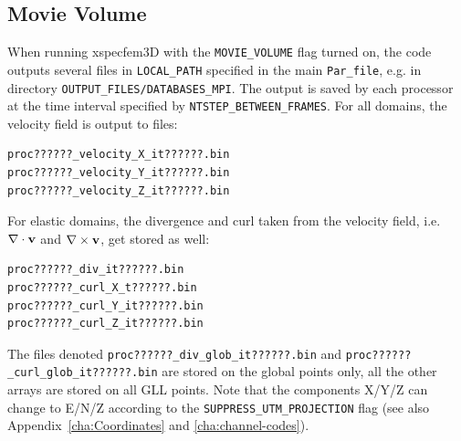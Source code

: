 \subsection{Movie Volume}\label{sub:Movie-Volume}

When running xspecfem3D with the
\texttt{\small MOVIE\_VOLUME}
flag turned on, the code outputs several files in \texttt{\small LOCAL\_PATH}
specified in the main \texttt{\small Par\_file},
e.g. in directory \texttt{\small OUTPUT\_FILES/DATABASES\_MPI}.
The output is saved by each processor at the time interval specified
by
\texttt{\small NTSTEP\_BETWEEN\_FRAMES}.
For all domains,
the velocity field is output to files:
{\small
\begin{verbatim}
proc??????_velocity_X_it??????.bin
proc??????_velocity_Y_it??????.bin
proc??????_velocity_Z_it??????.bin
\end{verbatim}
}
\noindent
For elastic domains, the divergence and curl taken from the velocity field,
i.e. $\nabla\cdot{\bf {v}}$ and $\nabla\times{\bf {v}}$, get stored
as well:
{\small
\begin{verbatim}
proc??????_div_it??????.bin
proc??????_curl_X_t??????.bin
proc??????_curl_Y_it??????.bin
proc??????_curl_Z_it??????.bin
\end{verbatim}
}
\noindent
The files denoted \texttt{\small proc??????\_div\_glob\_it??????.bin} and
\texttt{\small proc??????\_curl\_glob\_it??????.bin}
are stored on the global points only, all the other arrays are stored
on all GLL points. Note that the components X/Y/Z can change to E/N/Z
according to the
\texttt{\small SUPPRESS\_UTM\_PROJECTION}
flag (see also Appendix~\ref{cha:Coordinates} and \ref{cha:channel-codes}).

